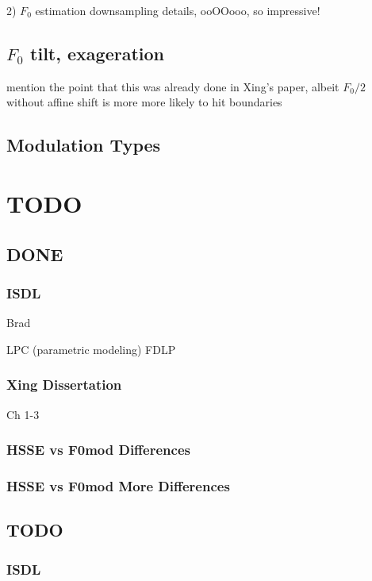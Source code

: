 \documentclass [11pt, proquest] {uwthesis}[2015/03/03]
\begin{document}
2) $F_0$ estimation downsampling details, ooOOooo, so impressive!

\section{$F_0$ tilt, exageration}

mention the point that this was already done in Xing's paper, albeit $F_0/2$ without affine shift is more more likely to hit boundaries 

\section{Modulation Types}


\chapter{TODO}


\section{DONE}

\subsection{ISDL}

Brad

LPC (parametric modeling) FDLP


\subsection{Xing Dissertation}

Ch 1-3

\subsection{HSSE vs F0mod Differences}


\subsection{HSSE vs F0mod More Differences}


\section{TODO}

\subsection{ISDL}
\end{document}
